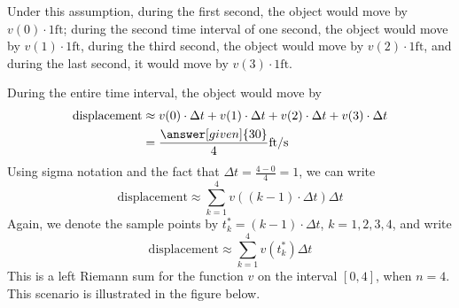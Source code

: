\documentclass{ximera}
\begin{document}
\begin{example}
\begin{explanation}
Under this assumption, during the first second, the object would move
by $v(0)\cdot1 \mathrm{ft}$; during the second time interval of one
second, the object would move by $v(1)\cdot1 \mathrm{ft}$, during the
third second, the object would move by $v(2)\cdot1 \mathrm{ft}$, and
during the last second, it would move by $v(3)\cdot1 \mathrm{ft}$.
 
During the entire time interval, the object would move by
\begin{align*}
  \text{displacement} &\approx v(0)\cdot\Delta t+v(1)\cdot\Delta t+v(2)\cdot\Delta t+v(3)\cdot\Delta t\\
  &=\frac{\answer[given]{30}}{4} \mathrm{ft}/\mathrm{s}
\end{align*}
Using sigma notation and the fact that $\Delta t=\frac{4-0}{4}=1$, we can write
\[
   \text{displacement}\approx \sum_{k=1}^4v((k-1)\cdot\Delta t)\Delta t
  \]
  Again, we denote the  sample points by $t_{k}^*=(k-1)\cdot\Delta t$, $k=1,2,3,4$, and write
  \[
   \text{displacement}\approx \sum_{k=1}^4v(t_{k}^*)\Delta t
  \]
  This is a left Riemann sum for the function $v$ on the interval $[0,4]$, when $n=4$.
This scenario is illustrated in the figure below.
\begin{image}
\end{image}
\end{explanation}
\end{example}
\end{document}
